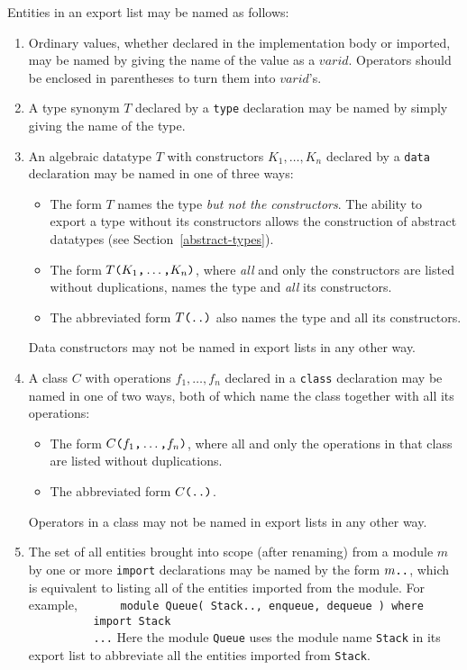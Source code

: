 Entities in an export list may be named as follows:
\begin{enumerate}
\item
Ordinary values, whether declared in the implementation
body or imported,
may be named by giving the name of the value as a $varid$.
Operators should be enclosed in parentheses to turn them into
$varid$'s.
\item
A type synonym $T$ declared by a \mbox{\tt type} declaration
may be named by simply giving the name of the type.
\item
An algebraic datatype $T$ with constructors $K_1,\ldots,K_n$
declared by a \mbox{\tt data} declaration may be named in one of three ways:
\begin{itemize}
\item
The form $T$ names the type {\em but not the constructors}.
The ability to export a type without its constructors allows the
construction of abstract datatypes (see Section~\ref{abstract-types}).
\item
The form $T\mbox{\tt (}K_1\mbox{\tt ,}\ldots\mbox{\tt ,}K_n\mbox{\tt )}$, where
{\em all} and only the constructors are listed without duplications,
names the type and {\em all} its constructors.  
\item
The abbreviated form $T\mbox{\tt (..)}$ also names the type 
and all its constructors.
\end{itemize}
Data constructors may not be named in export lists in any other way.
\item
A class $C$ with operations $f_1,\ldots,f_n$
declared in a \mbox{\tt class} declaration may be named in one of two ways, both of which
name the class together with all its operations:
\begin{itemize}
\item
The form $C\mbox{\tt (}f_1\mbox{\tt ,}\ldots\mbox{\tt ,}f_n\mbox{\tt )}$, where
all and only the operations in that class are listed without duplications.
\item
The abbreviated form $C\mbox{\tt (..)}$.
\end{itemize}
Operators in a class may not be named in export lists in any other way.
\item
The set of all entities brought into scope (after renaming) from a
module $m$ by one or more \mbox{\tt import} declarations may be named by the
form $m\mbox{\tt ..}$, which is equivalent to listing all of the entities
imported from the module.  For example,
\bprog
\mbox{\tt \ \ \ \ \ \ module\ Queue(\ Stack..,\ enqueue,\ dequeue\ )\ where}\\
\mbox{\tt \ \ \ \ \ \ \ \ \ \ import\ Stack}\\
\mbox{\tt \ \ \ \ \ \ \ \ \ \ ...}
\eprog
Here the module \mbox{\tt Queue} uses the module name \mbox{\tt Stack} in its export
list to abbreviate all the entities imported from \mbox{\tt Stack}.


\end{enumerate}
